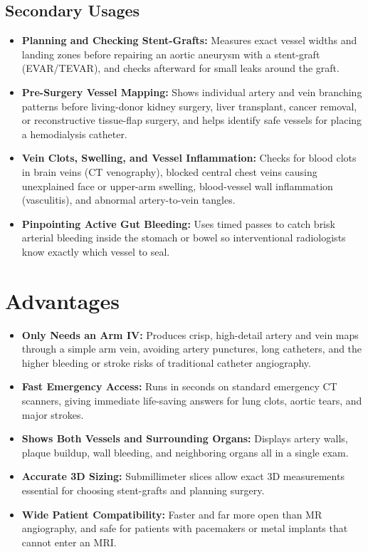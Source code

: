 \subsection{Secondary Usages}
\begin{itemize}
    \item \textbf{Planning and Checking Stent-Grafts:} Measures exact vessel widths and landing zones before repairing an aortic aneurysm with a stent-graft (EVAR/TEVAR), and checks afterward for small leaks around the graft.
    \item \textbf{Pre-Surgery Vessel Mapping:} Shows individual artery and vein branching patterns before living-donor kidney surgery, liver transplant, cancer removal, or reconstructive tissue-flap surgery, and helps identify safe vessels for placing a hemodialysis catheter.
    \item \textbf{Vein Clots, Swelling, and Vessel Inflammation:} Checks for blood clots in brain veins (CT venography), blocked central chest veins causing unexplained face or upper-arm swelling, blood-vessel wall inflammation (vasculitis), and abnormal artery-to-vein tangles.
    \item \textbf{Pinpointing Active Gut Bleeding:} Uses timed passes to catch brisk arterial bleeding inside the stomach or bowel so interventional radiologists know exactly which vessel to seal.
\end{itemize}

\section{Advantages}
\begin{itemize}
    \item \textbf{Only Needs an Arm IV:} Produces crisp, high-detail artery and vein maps through a simple arm vein, avoiding artery punctures, long catheters, and the higher bleeding or stroke risks of traditional catheter angiography.
    \item \textbf{Fast Emergency Access:} Runs in seconds on standard emergency CT scanners, giving immediate life-saving answers for lung clots, aortic tears, and major strokes.
    \item \textbf{Shows Both Vessels and Surrounding Organs:} Displays artery walls, plaque buildup, wall bleeding, and neighboring organs all in a single exam.
    \item \textbf{Accurate 3D Sizing:} Submillimeter slices allow exact 3D measurements essential for choosing stent-grafts and planning surgery.
    \item \textbf{Wide Patient Compatibility:} Faster and far more open than MR angiography, and safe for patients with pacemakers or metal implants that cannot enter an MRI.
\end{itemize}

